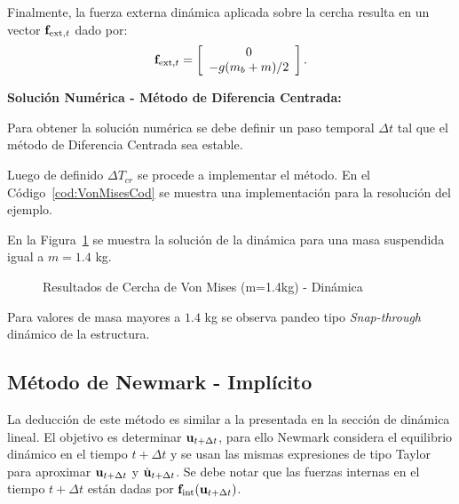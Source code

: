Finalmente, la fuerza externa dinámica aplicada sobre la cercha resulta en un vector ${\bf f}_{\text{ext},t}$ dado por:
%
\begin{equation}
{\bf f}_{\text{ext},t} = \left[\begin{array}{c} 0\\ -g(m_b+m)/2\end{array}\right].
\end{equation}

\textbf{Solución Numérica - Método de Diferencia Centrada:}

Para obtener la solución numérica se debe definir un paso temporal $\Delta t$ tal que el método de Diferencia Centrada sea estable.


Luego de definido $\Delta T_{cr}$ se procede a implementar el método. En el Código~\ref{cod:VonMisesCod} se muestra una implementación para la resolución del ejemplo.



En la Figura~\ref{fig:ResVM} se muestra la solución de la dinámica para una masa suspendida igual a $m = 1.4$ kg.

\begin{figure}[!htb]
	\centering
	\resizebox{.95\linewidth}{!}{}
	\caption{Resultados de Cercha de Von Mises (m=1.4kg) - Dinámica}
	\label{fig:ResVM}
\end{figure}


Para valores de masa mayores a $1.4$ kg se observa pandeo tipo \textit{Snap-through} dinámico de la estructura.



\subsection{Método de Newmark - Implícito}

La deducción de este método es similar a la presentada en la sección de dinámica lineal. %
%
El objetivo es determinar ${\bf u}_{t+\Delta t}$, para ello Newmark considera el equilibrio dinámico en el tiempo $t+\Delta t$ y se usan las mismas expresiones de tipo Taylor para aproximar ${\bf u}_{t+\Delta t}$ y $\dot{{\bf u}}_{t+\Delta t}$. Se debe notar que las fuerzas internas en el tiempo $t+\Delta t$ están dadas por ${\bf f}_{\text{int}}({\bf u}_{t+\Delta t})$.

